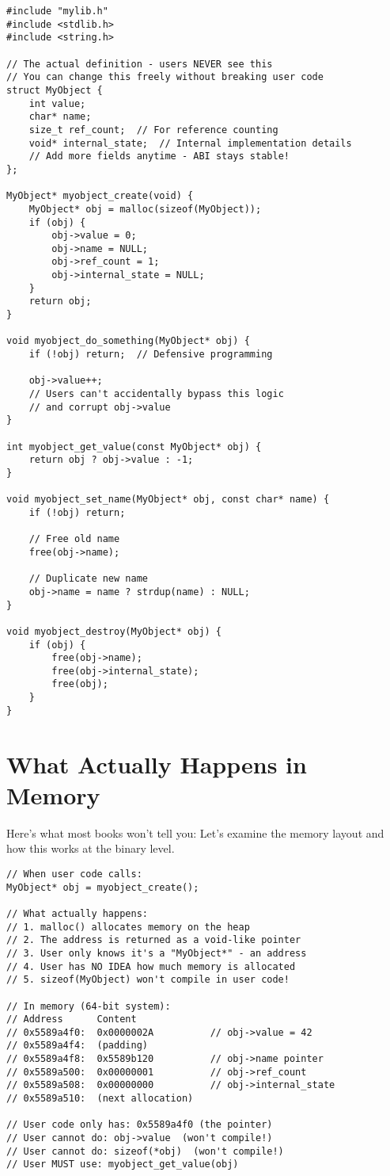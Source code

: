 \begin{lstlisting}
#include "mylib.h"
#include <stdlib.h>
#include <string.h>

// The actual definition - users NEVER see this
// You can change this freely without breaking user code
struct MyObject {
    int value;
    char* name;
    size_t ref_count;  // For reference counting
    void* internal_state;  // Internal implementation details
    // Add more fields anytime - ABI stays stable!
};

MyObject* myobject_create(void) {
    MyObject* obj = malloc(sizeof(MyObject));
    if (obj) {
        obj->value = 0;
        obj->name = NULL;
        obj->ref_count = 1;
        obj->internal_state = NULL;
    }
    return obj;
}

void myobject_do_something(MyObject* obj) {
    if (!obj) return;  // Defensive programming

    obj->value++;
    // Users can't accidentally bypass this logic
    // and corrupt obj->value
}

int myobject_get_value(const MyObject* obj) {
    return obj ? obj->value : -1;
}

void myobject_set_name(MyObject* obj, const char* name) {
    if (!obj) return;

    // Free old name
    free(obj->name);

    // Duplicate new name
    obj->name = name ? strdup(name) : NULL;
}

void myobject_destroy(MyObject* obj) {
    if (obj) {
        free(obj->name);
        free(obj->internal_state);
        free(obj);
    }
}
\end{lstlisting}

\section{What Actually Happens in Memory}

Here's what most books won't tell you: Let's examine the memory layout and how this works at the binary level.

\begin{lstlisting}
// When user code calls:
MyObject* obj = myobject_create();

// What actually happens:
// 1. malloc() allocates memory on the heap
// 2. The address is returned as a void-like pointer
// 3. User only knows it's a "MyObject*" - an address
// 4. User has NO IDEA how much memory is allocated
// 5. sizeof(MyObject) won't compile in user code!

// In memory (64-bit system):
// Address      Content
// 0x5589a4f0:  0x0000002A          // obj->value = 42
// 0x5589a4f4:  (padding)
// 0x5589a4f8:  0x5589b120          // obj->name pointer
// 0x5589a500:  0x00000001          // obj->ref_count
// 0x5589a508:  0x00000000          // obj->internal_state
// 0x5589a510:  (next allocation)

// User code only has: 0x5589a4f0 (the pointer)
// User cannot do: obj->value  (won't compile!)
// User cannot do: sizeof(*obj)  (won't compile!)
// User MUST use: myobject_get_value(obj)
\end{lstlisting}

